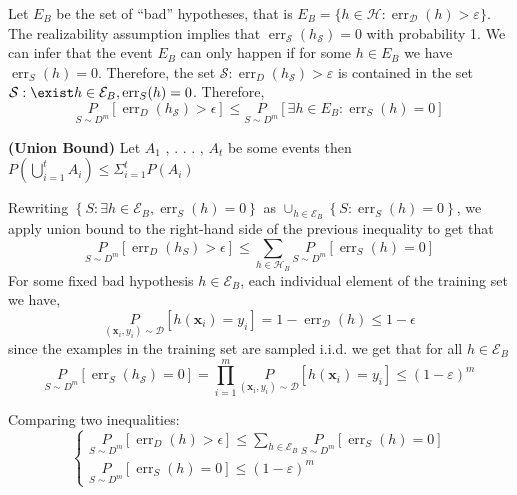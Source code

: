 Let $E_{B}$ be the set of “bad” hypotheses, that is $ E_{B} = \{h \in \mathcal{H} :\operatorname{err}_{\mathcal{D}}(h) > \varepsilon\}$. The realizability assumption implies that $\operatorname{err}_{\mathcal{S}}(h_{\mathcal{S}}) = 0$ with probability 1. We can infer that the event $E_{B}$ can only happen if for some $h \in E_{B}$ we have $\operatorname{err}_{S}(h) = 0$. Therefore, the set ${\mathcal{S} : \operatorname{err}_{D}(h_{\mathcal{S}}) > \varepsilon}$ is contained in the set ${\mathcal{S} : \exist h \in \mathcal{E}_{B},\operatorname{err}_{S}(h) = 0}$. Therefore,
\begin{equation*}
    \underset{S \sim D^{m}}{P}\left[\operatorname{err}_{D}\left(h_{\mathcal{S}}\right)>\epsilon\right] \leq \underset{S \sim D^{m}}{P}\left[\exists h \in E_{B}: \operatorname{err}_{S}(h)=0\right]
\end{equation*}

\begin{lemma}{\textbf{(Union Bound)}}
Let $A_{1}$ , . . . , $A_{t}$ be some events then $P(\bigcup_{i=1}^{t}A_{i}) \leq \Sigma_{i=1}^{t}P(A_{i})$
\end{lemma}

\bigskip
Rewriting $\left\{S: \exists h \in \mathcal{E}_{B}, \operatorname{err}_{S}(h)=0\right\}$ as $\cup_{h \in \mathcal{E}_{B}}\left\{S: \operatorname{err}_{S}(h)=0\right\}$, we apply union bound to the right-hand side of the previous inequality to get that
$$
\underset{S \sim D^{m}}{P}\left[\operatorname{err}_{D}\left(h_{S}\right)>\epsilon\right] \leq \sum_{h \in \mathcal{H}_{B}} \underset{S \sim D^{m}}{P}\left[\operatorname{err}_{S}(h)=0\right]
$$
For some fixed bad hypothesis $h \in \mathcal{E}_{B}$, each individual element of the training set we have,
$$
\underset{\left(\mathbf{x}_{i}, y_{i}\right) \sim \mathcal{D}}{P}\left[h\left(\mathbf{x}_{i}\right)=y_{i}\right]=1-\operatorname{err}_{\mathcal{D}}(h) \leq 1-\epsilon
$$
since the examples in the training set are sampled i.i.d. we get that for all $h \in \mathcal{E}_{B}$
$$
\underset{S \sim D^{m}}{P}\left[\operatorname{err}_{S}(h_{\mathcal{S}})=0\right]=\prod_{i=1}^{m} \underset{\left(\mathbf{x}_{i}, y_{i}\right) \sim \mathcal{D}}{P}\left[h\left(\mathbf{x}_{i}\right)=y_{i}\right] \leq(1-\varepsilon)^{m}
$$

Comparing two inequalities: 
\[ \begin{cases} 
      \underset{S \sim D^{m}}{P}\left[\operatorname{err}_{D}\left(h\right)>\epsilon\right] \leq \sum_{h \in \mathcal{E}_{B}} \underset{S \sim D^{m}}{P}\left[\operatorname{err}_{S}(h)=0\right] \\
     \underset{S \sim D^{m}}{P}\left[\operatorname{err}_{S}(h)=0\right] \leq(1-\varepsilon)^{m} 
   \end{cases}
\]

